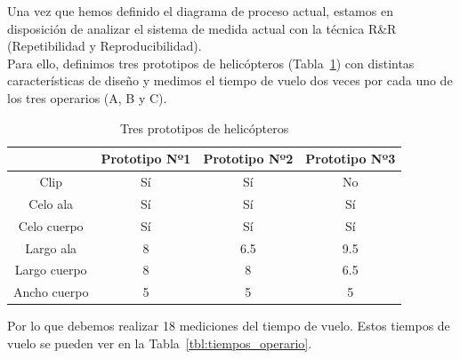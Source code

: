 \documentclass[12pt,a4paper,twoside,openright,titlepage,final]{article}
\begin{document}
Una vez que hemos definido el diagrama de proceso actual, estamos en disposición de analizar el sistema de medida actual con la técnica R\&R (Repetibilidad y Reproducibilidad).\\

Para ello, definimos tres prototipos de helicópteros (Tabla~\ref{tbl:prototipos}) con distintas características de diseño y medimos el tiempo de vuelo dos veces por cada uno de los tres operarios (A, B y C).\\

\begin{table}[htbp!]
	\centering
	\caption{Tres prototipos de helicópteros}
	\label{tbl:prototipos}
	\begin{tabular}{@{}cccc@{}}
		\cmidrule(l){2-4}
		& Prototipo Nº1 & Prototipo Nº2 & Prototipo Nº3 \\ \midrule
		Clip         & Sí            & Sí            & No            \\
		Celo ala     & Sí            & Sí            & Sí            \\
		Celo cuerpo  & Sí            & Sí            & Sí            \\
		Largo ala    & 8             & 6.5           & 9.5           \\
		Largo cuerpo & 8             & 8             & 6.5           \\
		Ancho cuerpo & 5             & 5             & 5             \\ \bottomrule
	\end{tabular}
\end{table}

Por lo que debemos realizar 18 mediciones del tiempo de vuelo. Estos tiempos de vuelo se pueden ver en la Tabla~\ref{tbl:tiempos_operario}.
\end{document}
